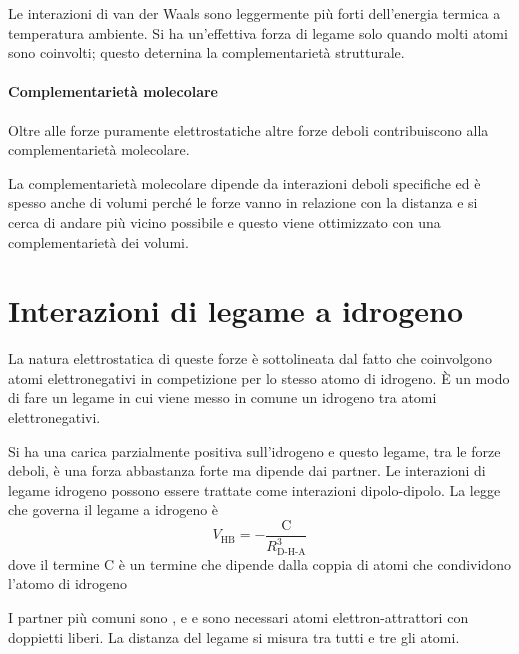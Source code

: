 
Le interazioni di van der Waals sono leggermente più forti dell'energia termica a
temperatura ambiente.
Si ha un'effettiva forza di legame solo quando molti atomi sono
coinvolti; questo deternina la complementarietà strutturale.

\paragraph{Complementarietà molecolare}

Oltre alle forze puramente elettrostatiche altre forze deboli
contribuiscono alla complementarietà molecolare.

La complementarietà molecolare dipende da interazioni deboli specifiche
ed è spesso anche di volumi perché le forze vanno in relazione con la
distanza e si cerca di andare più vicino possibile e questo viene
ottimizzato con una complementarietà dei volumi.


\section{Interazioni di legame a idrogeno}

La natura elettrostatica di queste forze è sottolineata dal fatto che
coinvolgono atomi elettronegativi in competizione per lo stesso atomo di
idrogeno.
È un modo di fare un legame in cui viene messo in comune un idrogeno tra
atomi elettronegativi.

Si ha una carica parzialmente positiva sull'idrogeno e questo legame, tra le
forze deboli, è una forza abbastanza forte ma dipende dai partner.
Le interazioni di legame idrogeno possono essere trattate come
interazioni dipolo-dipolo.
La legge che governa il legame a idrogeno è
\[
  V_{\text{HB}} = - \frac{\text{C}}{R^3_{\text{D-H-A}}}
\]
dove il termine $\text{C}$ è un termine che dipende dalla coppia di atomi che condividono l'atomo di idrogeno 

I partner più comuni sono ,  e  e sono necessari atomi elettron-attrattori con doppietti liberi. La distanza del legame si misura tra
tutti e tre gli atomi.


